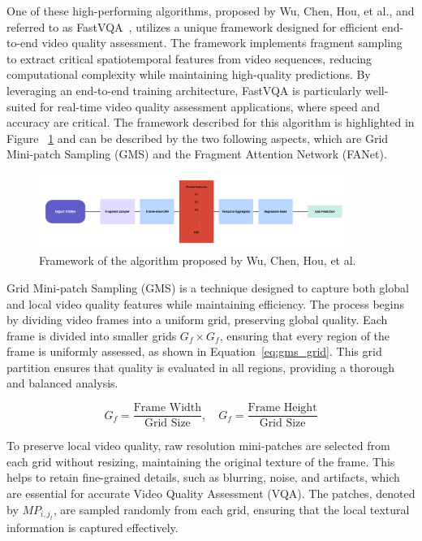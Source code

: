 One of these high-performing algorithms, proposed by Wu, Chen, Hou, et al., and referred to as FastVQA~\cite{wu2022fastvqa}, utilizes a unique framework designed for efficient end-to-end video quality assessment. The framework implements fragment sampling to extract critical spatiotemporal features from video sequences, reducing computational complexity while maintaining high-quality predictions. By leveraging an end-to-end training architecture, FastVQA is particularly well-suited for real-time video quality assessment applications, where speed and accuracy are critical. The framework described for this algorithm is highlighted in Figure ~\ref{fig:framework1} and can be described by the two following aspects, which are Grid Mini-patch Sampling (GMS) and the Fragment Attention Network (FANet).

\begin{figure}
    \centering
    \includegraphics[width=0.9\textwidth]{figures/FastVQA_framework.png}
    \caption{Framework of the algorithm proposed by Wu, Chen, Hou, et al.~\cite{wu2022fastvqa}}
    \label{fig:framework1}
\end{figure}

Grid Mini-patch Sampling (GMS) is a technique designed to capture both global and local video quality features while maintaining efficiency. The process begins by dividing video frames into a uniform grid, preserving global quality. Each frame is divided into smaller grids \(G_f \times G_f\), ensuring that every region of the frame is uniformly assessed, as shown in Equation~\ref{eq:gms_grid}. This grid partition ensures that quality is evaluated in all regions, providing a thorough and balanced analysis.

\begin{equation}
G_f = \frac{\text{Frame Width}}{\text{Grid Size}}, \quad G_f = \frac{\text{Frame Height}}{\text{Grid Size}}
\label{eq:gms_grid}
\end{equation}

To preserve local video quality, raw resolution mini-patches are selected from each grid without resizing, maintaining the original texture of the frame. This helps to retain fine-grained details, such as blurring, noise, and artifacts, which are essential for accurate Video Quality Assessment (VQA). The patches, denoted by $MP_{i,j_t}$, are sampled randomly from each grid, ensuring that the local textural information is captured effectively.

